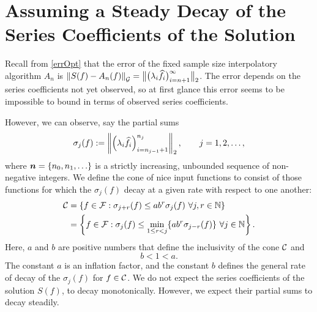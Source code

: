 \documentclass[final]{elsarticle}
\theoremstyle{definition}
\theoremstyle{remark}
\newcommand{\optAn}{A_n}
\begin{document}
\section{Assuming a Steady Decay of the Series Coefficients of the Solution} \label{sec:cone}

Recall from \eqref{errOpt} that the error of the fixed sample size interpolatory algorithm $\optAn$ is $\norm[\cg]{S(f) - \optAn(f)} = \bignorm[2]{\bigl(\lambda_{i} \hf_{i} \bigr)_{i= n+1}^{\infty}}$.  The error depends on the series coefficients not yet observed, so at first glance this error seems to be impossible to bound in terms of observed series coefficients.  

However, we can observe, say the partial sums 
\begin{equation} \label{sumdef}
\sigma_j(f) :
= \norm[2]{ \left(\lambda_{i} \hf_{i} \right)_{i=n_{j-1}+1}^{n_j}}, \qquad j=1, 2, \ldots,
\end{equation}
where $\vn  = \{n_0, n_1, \ldots\}$ is a strictly increasing, unbounded sequence of non-negative integers.  We define the cone of nice input functions to consist of those functions for which the $\sigma_j(f)$ decay at a given rate with respect to one another:
\begin{align} \label{decayconedef}
\cc &= \left\{ f \in \cf : \sigma_{j+r}(f) \le ab^r \sigma_j (f) \ \forall j,r \in \naturals \right\} \\
\nonumber
& = \left\{ f \in \cf : \sigma_j(f) \le \min_{1 \le r < j}\{ab^r\sigma_{j-r}(f)\} \ \forall j \in \naturals \right\}.
\end{align}
Here, $a$ and $b$ are positive numbers that define the inclusivity of the cone $\cc$ and 
\begin{equation} \label{abcond}
b <1 < a.
\end{equation}
The constant $a$ is an inflation factor, and the constant $b$ defines the general rate of decay of the $\sigma_j(f)$ for $f \in \cc$. We do not expect the series coefficients of the solution $S(f)$, to decay monotonically. However, we expect their partial sums to decay steadily.
\end{document}
